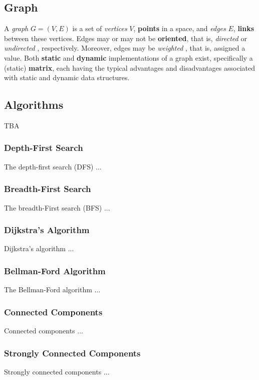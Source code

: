 \documentclass[10pt,onecolumn]{article}
\begin{document}
\subsection{Graph}
 A \textit{graph} \cite{REF_graph} $G = (V, E)$ is a set of \textit{vertices} \cite{REF_graph} $V$, \textbf{points} in a space, and \textit{edges} \cite{REF_graph} $E$, \textbf{links} between these vertices. Edges may or may not be \textbf{oriented}, that is, \textit{directed} \cite{REF_graph} or \textit{undirected} \cite{REF_graph}, respectively. Moreover, edges may be \textit{weighted} \cite{REF_graph}, that is, assigned a value. Both \textbf{static} and \textbf{dynamic} implementations of a graph exist, specifically a (static) \textbf{matrix}, each having the typical advantages and disadvantages associated with static and dynamic data structures.

\subsection{Algorithms}
TBA

\subsubsection{Depth-First Search}
The depth-first search \cite{REF_graph} (DFS) ...

\subsubsection{Breadth-First Search}
The breadth-First search \cite{REF_graph} (BFS) ...

\subsubsection{Dijkstra's Algorithm}
Dijkstra's algorithm \cite{REF_} ...

\subsubsection{Bellman-Ford Algorithm}
The Bellman-Ford algorithm \cite{REF_} ...

\subsubsection{Connected Components}
Connected components \cite{REF_} ...

\subsubsection{Strongly Connected Components}
Strongly connected components \cite{REF_} ...
\end{document}
